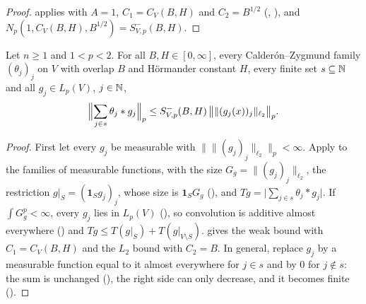 \begin{proof}
\leanok
{} applies with $A = 1$, $C_1 = C_V(B, H)$ and
$C_2 = B^{1/2}$ (, ), and
$N_p(1, C_V(B, H), B^{1/2}) = S^-_{V,p}(B, H)$.
\end{proof}

\begin{theorem}
\label{thm:cz-synthesis-below-two}
\leanok
{}
Let $n \geq 1$ and $1 < p < 2$. For all $B, H \in [0, \infty]$, every Calder\'on--Zygmund family
$(\theta_j)_j$ on $V$ with overlap $B$ and H\"ormander constant $H$, every finite set
$s \subseteq \mathbb{N}$ and all $g_j \in L_p(V)$, $j \in \mathbb{N}$,
\[
  \Bigl\| \sum_{j \in s} \theta_j * g_j \Bigr\|_p
  \leq S^-_{V,p}(B, H) \, \bigl\| \|(g_j(x))_j\|_{\ell_2} \bigr\|_p .
\]
\end{theorem}

\begin{proof}
\leanok
First let every $g_j$ be measurable with
$\bigl\| \|(g_j)_j\|_{\ell_2} \bigr\|_p < \infty$. Apply  to
the families of measurable functions, with the size $G_g = \|(g_j)_j\|_{\ell_2}$, the
restriction $g|_S = (\mathbf 1_S g_j)_j$, whose size is $\mathbf 1_S G_g$
(), and
$T g = \bigl|\sum_{j \in s} \theta_j * g_j\bigr|$. If $\int G_g^p < \infty$, every $g_j$ lies in
$L_p(V)$ (), so convolution is additive almost everywhere
() and $T g \leq T(g|_S) + T(g|_{V \setminus S})$.
 gives the weak bound with $C_1 = C_V(B, H)$ and
 the $L_2$ bound with $C_2 = B$. In general, replace $g_j$ by a
measurable function equal to it almost everywhere for $j \in s$ and by $0$ for $j \notin s$: the
sum is unchanged (), the right side can only decrease, and it becomes finite
().
\end{proof}

